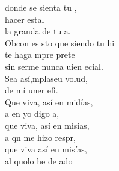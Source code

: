 \begin{cancion}
	donde  se sienta tu ,\\
	hacer estal \\
	la granda de tu a.\\
	Obcon es sto que siendo tu hi \\
	te haga mpre prete\\
	sin serme nunca uien ecial.\\
	\jump
	Sea así,mplaseu volud,\\
	 de mí uner efi.\\
	Que viva, así en midías,\\
	a en yo digo a,\\
	que viva, así en misías,\\
	a qn me hizo respr,\\
	que viva así en misías,\\
	al quolo he de ado \\
	\jump
\end{cancion}%

